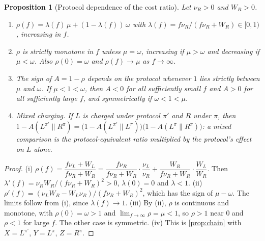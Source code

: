 \documentclass[11pt]{article}
\newtheorem{proposition}{Proposition}
\theoremstyle{remark}
\begin{document}
\begin{proposition}[Protocol dependence of the cost ratio]\label{prop:protocol}
Let $\nu_R>0$ and $W_R>0$.
\begin{enumerate}[label=(\roman*),itemsep=1pt]
\item $\rho(f)=\lambda(f)\,\mu+(1-\lambda(f))\,\omega$ with $\lambda(f)=f\nu_R/(f\nu_R+W_R)\in[0,1)$, increasing in $f$.
\item $\rho$ is strictly monotone in $f$ unless $\mu=\omega$, increasing if $\mu>\omega$ and decreasing if $\mu<\omega$. Also $\rho(0)=\omega$ and $\rho(f)\to\mu$ as $f\to\infty$.
\item The sign of $A=1-\rho$ depends on the protocol whenever $1$ lies strictly between $\mu$ and $\omega$. If $\mu<1<\omega$, then $A<0$ for all sufficiently small $f$ and $A>0$ for all sufficiently large $f$, and symmetrically if $\omega<1<\mu$.
\item \emph{Mixed charging.} If $L$ is charged under protocol $\pi'$ and $R$ under $\pi$, then $1-A(L^{\pi'}\|R^{\pi}) = \bigl(1-A(L^{\pi'}\|L^{\pi})\bigr)\bigl(1-A(L^{\pi}\|R^{\pi})\bigr)$: a mixed comparison is the protocol-equivalent ratio multiplied by the protocol's effect on $L$ alone.
\end{enumerate}
\end{proposition}
\begin{proof}
(i) $\rho(f)=\dfrac{f\nu_L+W_L}{f\nu_R+W_R}=\dfrac{f\nu_R}{f\nu_R+W_R}\cdot\dfrac{\nu_L}{\nu_R}+\dfrac{W_R}{f\nu_R+W_R}\cdot\dfrac{W_L}{W_R}$. Then $\lambda'(f)=\nu_RW_R/(f\nu_R+W_R)^2>0$, $\lambda(0)=0$ and $\lambda<1$.
(ii) $\rho'(f)=(\nu_LW_R-W_L\nu_R)/(f\nu_R+W_R)^2$, which has the sign of $\mu-\omega$. The limits follow from (i), since $\lambda(f)\to1$.
(iii) By (ii), $\rho$ is continuous and monotone, with $\rho(0)=\omega>1$ and $\lim_{f\to\infty}\rho=\mu<1$, so $\rho>1$ near $0$ and $\rho<1$ for large $f$. The other case is symmetric.
(iv) This is \cref{prop:chain} with $X=L^{\pi'}$, $Y=L^{\pi}$, $Z=R^{\pi}$.
\end{proof}
\end{document}
